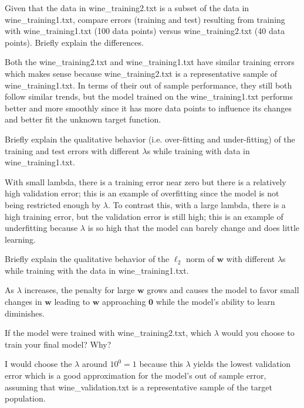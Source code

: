 \problem[4]
Given that the data in wine\_training2.txt is a subset of the data in wine\_training1.txt, compare errors (training and test) resulting from training with wine\_training1.txt (100 data points) versus wine\_training2.txt (40 data points). Briefly explain the differences.

\begin{solution}
  Both the wine_training2.txt and wine_training1.txt have similar training errors which makes sense because wine_training2.txt is a representative sample of wine_training1.txt. In terms of their out of sample performance, they still both follow similar trends, but the model trained on the wine_training1.txt performs better and more smoothly since it has more data points to influence its changes and better fit the unknown target function. 
\end{solution}

\problem[4]
Briefly explain the qualitative behavior (i.e. over-fitting and under-fitting) of the training and test errors with different $\lambda$s while training with data in wine\_training1.txt.

\begin{solution}
  With small lambda, there is a training error near zero but there is a relatively high validation error; this is an example of overfitting since the model is not being restricted enough by $\lambda$. To contrast this, with a large lambda, there is a high training error, but the validation error is still high; this is an example of underfitting because $\lambda$ is so high that the model can barely change and does little learning.
\end{solution}

\problem[4]
Briefly explain the qualitative behavior of the $\ell_2$ norm of $\textbf{w}$ with different $\lambda$s while training with the data in wine\_training1.txt.

\begin{solution}
  As $\lambda$ increases, the penalty for large $\mathbf{w}$ grows and causes the model to favor small changes in $\mathbf{w}$ leading to $\mathbf{w}$ approaching $\mathbf{0}$ while the model's ability to learn diminishes.
\end{solution}

\problem[4]
If the model were trained with wine\_training2.txt, which $\lambda$ would you choose to train your final model? Why?

\begin{solution}
  I would choose the $\lambda$ around $10^0 = 1$ because this $\lambda$ yields the lowest validation error which is a good approximation for the model's out of sample error, assuming that wine_validation.txt is a representative sample of the target population.
\end{solution}

